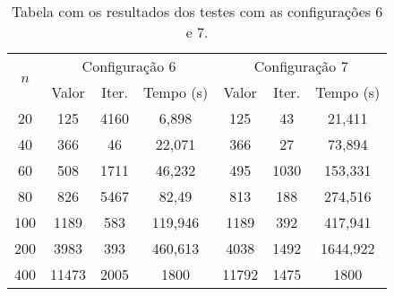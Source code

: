 \documentclass{MO824}
\begin{document}
\begin{table}[H]
    \centering
     \caption{Tabela com os resultados dos testes com as configurações 6 e 7.}
     \vspace{0.3cm}
      \begin{adjustbox}{max width=\textwidth}
    \begin{tabular}{|c|c|c|c|c|c|c|}
 \hline
 \multicolumn{1}{|c|}{\multirow{2}{*}{$n$}}  & \multicolumn{3}{c|}{Configuração 6}  & \multicolumn{3}{c|}{Configuração 7}    \\ \cline{2-7} 
 \multicolumn{1}{|c|}{} & \multicolumn{1}{c|}{Valor} & \multicolumn{1}{c|}{Iter.} & \multicolumn{1}{c|}{Tempo (s)} & \multicolumn{1}{c|}{Valor} & \multicolumn{1}{c|}{Iter.} & \multicolumn{1}{c|}{Tempo (s)} \\ \hline
 20 & 125 & 4160 & 6,898 & 125 & 43 & 21,411\\ \hline
 40 & 366 & 46 & 22,071 & 366 & 27 & 73,894\\ \hline
 60 & 508 & 1711 & 46,232 & 495 & 1030 & 153,331\\ \hline
 80 & 826 & 5467 & 82,49 & 813 & 188 & 274,516\\ \hline
 100 & 1189 & 583 & 119,946 & 1189 & 392 & 417,941\\ \hline
 200 & 3983 & 393 & 460,613 & 4038 & 1492 & 1644,922\\ \hline
 400 & 11473 & 2005 & 1800 & 11792 & 1475 & 1800\\ \hline
    \end{tabular}
    \end{adjustbox}
    \label{tab:conf67}
\end{table}

\vspace{-0.75cm}

{\footnotesize }

\clearpage
\end{document}
